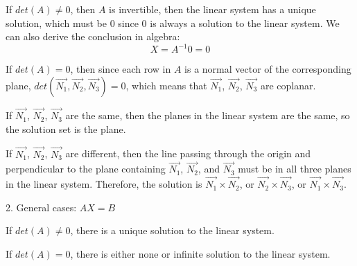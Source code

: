 \documentclass{article}
\begin{document}
If $det(A) \neq 0$, then $A$ is invertible, then the linear system has a unique 
solution, which must be $0$ since $0$ is always a solution to the linear 
system. We can also derive the conclusion in algebra:
\[
  X = A^{-1}0 = 0
\]

If $det(A) = 0$, then since each row in $A$ is a normal vector of the 
corresponding plane, $det(\vec{N_1}, \vec{N_2}, \vec{N_3}) = 0$, which means 
that $\vec{N_1}$, $\vec{N_2}$, $\vec{N_3}$ are coplanar.

  If $\vec{N_1}$, $\vec{N_2}$, $\vec{N_3}$ are the same, then the planes in the 
  linear system are the same, so the solution set is the plane.

  If $\vec{N_1}$, $\vec{N_2}$, $\vec{N_3}$ are different, then the line passing 
  through the origin and perpendicular to the plane containing $\vec{N_1}$, 
  $\vec{N_2}$, and $\vec{N_3}$ must be in all three planes in the linear 
  system. Therefore, the solution is $\vec{N_1} \times \vec{N_2}$, or 
  $\vec{N_2} \times \vec{N_3}$, or $\vec{N_1} \times \vec{N_3}$.

2. General cases: $AX = B$

If $det(A) \neq 0$, there is a unique solution to the linear system.

If $det(A) = 0$, there is either none or infinite solution to the linear system.
\end{document}
